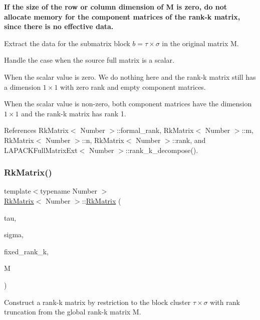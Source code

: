 {\bfseries If the size of the row or column dimension of {\ttfamily M} is zero, do not allocate memory for the component matrices of the rank-\/k matrix, since there is no effective data.}

Extract the data for the submatrix block $b = \tau \times \sigma$ in the original matrix {\ttfamily M}.

Handle the case when the source full matrix is a scalar.

When the scalar value is zero. We do nothing here and the rank-\/k matrix still has a dimension $1 \times 1$ with zero rank and empty component matrices.

When the scalar value is non-\/zero, both component matrices have the dimension $1 \times 1$ and the rank-\/k matrix has rank 1.

References Rk\+Matrix$<$ Number $>$\+::formal\+\_\+rank, Rk\+Matrix$<$ Number $>$\+::m, Rk\+Matrix$<$ Number $>$\+::n, Rk\+Matrix$<$ Number $>$\+::rank, and L\+A\+P\+A\+C\+K\+Full\+Matrix\+Ext$<$ Number $>$\+::rank\+\_\+k\+\_\+decompose().

\mbox{\label{classRkMatrix_aa5aff0d31115d7a67ef2f11db0b4ea24}} 
\subsubsection{\texorpdfstring{Rk\+Matrix()}{RkMatrix()}\hspace{0.1cm}{\footnotesize\ttfamily [10/19]}}
{\footnotesize\ttfamily template$<$typename Number $>$ \\
\hyperlink{classRkMatrix}{Rk\+Matrix}$<$ Number $>$\+::\hyperlink{classRkMatrix}{Rk\+Matrix} (\begin{DoxyParamCaption}\item[{const std\+::vector$<$ types\+::global\+\_\+dof\+\_\+index $>$ \&}]{tau,  }\item[{const std\+::vector$<$ types\+::global\+\_\+dof\+\_\+index $>$ \&}]{sigma,  }\item[{const \hyperlink{classRkMatrix_add060bfc3a4cc77f858c3d6dd58cadd5}{size\+\_\+type}}]{fixed\+\_\+rank\+\_\+k,  }\item[{const \hyperlink{classRkMatrix}{Rk\+Matrix}$<$ Number $>$ \&}]{M }\end{DoxyParamCaption})}

Construct a rank-\/k matrix by restriction to the block cluster $\tau \times \sigma$ with rank truncation from the global rank-\/k matrix {\ttfamily M}.


